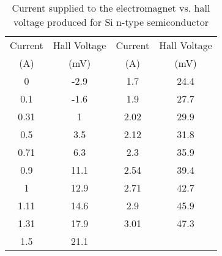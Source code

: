 \begin{table}[H]
    \centering
    \begin{tabular}{|c|c|c|c|}
    \hline
    Current & Hall Voltage & Current & Hall Voltage \\ 
    (A) & (mV) & (A) & (mV) \\ \hline
    0 & -2.9 & 1.7 & 24.4 \\ \hline
    0.1 & -1.6 & 1.9 & 27.7 \\ \hline
    0.31 & 1 & 2.02 & 29.9 \\ \hline
    0.5 & 3.5 & 2.12 & 31.8 \\ \hline
    0.71 & 6.3 & 2.3 & 35.9 \\ \hline
    0.9 & 11.1 & 2.54 & 39.4 \\ \hline
    1 & 12.9 & 2.71 & 42.7 \\ \hline
    1.11 & 14.6 & 2.9 & 45.9 \\ \hline
    1.31 & 17.9 & 3.01 & 47.3 \\ \hline
    1.5 & 21.1 &  &  \\ \hline
    \end{tabular}
    \caption{Current supplied to the electromagnet vs. hall voltage produced for Si n-type
    semiconductor}
    \label{tab:siN}
    \end{table}